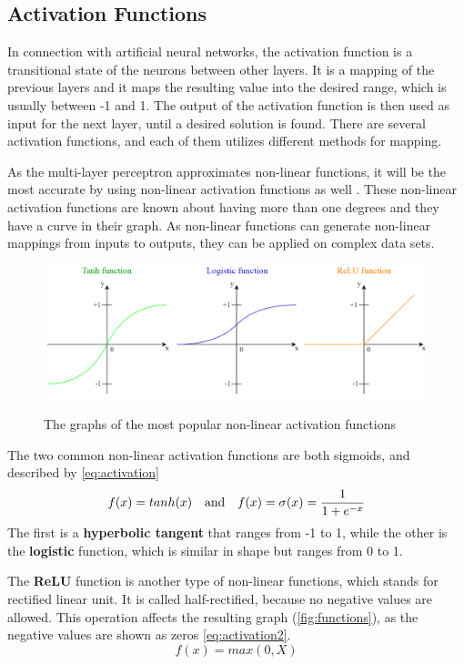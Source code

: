 \subsection{Activation Functions}

In connection with artificial neural networks, the activation function is a transitional state of the neurons between other layers. It is a mapping of the previous layers and it maps the resulting value into the desired range, which is usually between -1 and 1. The output of the activation function is then used as input for the next layer, until a desired solution is found. There are several activation functions, and each of them utilizes different methods for mapping. \medskip

As the multi-layer perceptron approximates non-linear functions, it will be the most accurate by using non-linear activation functions as well \cite{pillo2013nonlinear}. These non-linear activation functions are known about having more than one degrees and they have a curve in their graph. As non-linear functions can generate non-linear mappings from inputs to outputs, they can be applied on complex data sets. 

\begin{figure}[h]
	\centering
	\caption{The graphs of the most popular non-linear activation functions}
	\includegraphics[height=0.35\linewidth]{./figures/functions}
	\label{fig:functions}
\end{figure}

\bigskip \noindent The two common non-linear activation functions are both sigmoids, and described by \eqref{eq:activation}
\begin{equation} f(x)=tanh(x) ~~~ \hbox{and} ~~~ f(x)=\sigma (x)=\frac{1}{1+e^{-x}} \label{eq:activation} \end{equation}
The first is a \textbf{hyperbolic tangent} that ranges from -1 to 1, while the other is the \textbf{logistic} function, which is similar in shape but ranges from 0 to 1. \smallskip

The \textbf{ReLU} function is another type of non-linear functions, which stands for rectified linear unit. It is called half-rectified, because no negative values are allowed. This operation affects the resulting graph (\autoref{fig:functions}), as the negative values are shown as zeros \eqref{eq:activation2}.
\begin{equation} f(x) = max(0,X) \label{eq:activation2} \end{equation}



